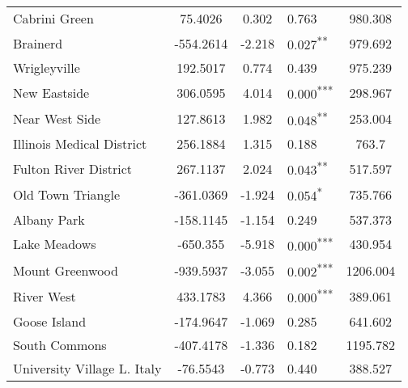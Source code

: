 \documentclass[12pt]{report}
\begin{document}
\begin{longtable}{l S[table-format=6.4] S[table-format=3.4] l S[table-format=4.4]}
	Cabrini Green                & 75.4026              & 0.302            & 0.763                      & 980.308                           \\
	Brainerd                     & -554.2614            & -2.218           & 0.027\textsuperscript{**}  & 979.692                           \\
	Wrigleyville                 & 192.5017             & 0.774            & 0.439                      & 975.239                           \\
	New Eastside                 & 306.0595             & 4.014            & 0.000\textsuperscript{***} & 298.967                           \\
	Near West Side               & 127.8613             & 1.982            & 0.048\textsuperscript{**}  & 253.004                           \\
	Illinois Medical District    & 256.1884             & 1.315            & 0.188                      & 763.7                             \\
	Fulton River District        & 267.1137             & 2.024            & 0.043\textsuperscript{**}  & 517.597                           \\
	Old Town Triangle            & -361.0369            & -1.924           & 0.054\textsuperscript{*}   & 735.766                           \\
	Albany Park                  & -158.1145            & -1.154           & 0.249                      & 537.373                           \\
	Lake Meadows                 & -650.355             & -5.918           & 0.000\textsuperscript{***} & 430.954                           \\
	Mount Greenwood              & -939.5937            & -3.055           & 0.002\textsuperscript{***} & 1206.004                          \\
	River West                   & 433.1783             & 4.366            & 0.000\textsuperscript{***} & 389.061                           \\
	Goose Island                 & -174.9647            & -1.069           & 0.285                      & 641.602                           \\
	South Commons                & -407.4178            & -1.336           & 0.182                      & 1195.782                          \\
	University Village L. Italy  & -76.5543             & -0.773           & 0.440                      & 388.527                           \\

\end{longtable}
\end{document}
